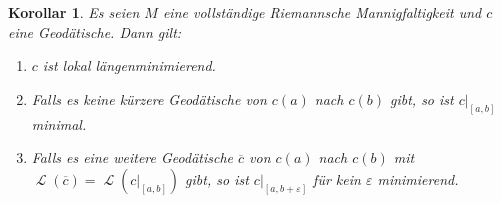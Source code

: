 \documentclass[paper=A4, twoside, chapterprefix=true, bibliography=totoc, headsepline]{scrbook}
\let\temp\phi{}
\let\phi\varphi{}
\let\varphi\temp{}
\let\temp\theta{}
\let\theta\vartheta{}
\let\vartheta\temp{}
\let\temp\epsilon{}
\let\epsilon\varepsilon{}
\let\varepsilon\temp{}
\let\temp\rho{}
\let\rho\varrho{}
\let\varrho\temp{}
\DeclareMathOperator{\calL}{\mathcal{L}}
\theoremstyle{plain}
\newtheorem{Kor}[Dfn]{Korollar}
\theoremstyle{nonumberplain}
\theoremstyle{empty}
\theoremstyle{break}
\begin{document}
\begin{Kor}\label{thm:kor-8-12}
  Es seien $M$ eine vollst\"andige Riemannsche Mannigfaltigkeit und $c$ eine Geod\"atische. Dann gilt:
  \begin{enumerate}[label=(\roman*),widest=iii,leftmargin=*]
  \item $c$ ist lokal l\"angenminimierend.
  \item Falls es keine k\"urzere Geod\"atische von $c(a)$ nach $c(b)$ gibt, so ist $c|_{[a,b]}$ minimal.
  \item Falls es eine weitere Geod\"atische $\overline{c}$ von $c(a)$ nach $c(b)$ mit $\calL(\overline c) = \calL(c|_{[a,b]})$ gibt, so ist $c|_{[a,b+\epsilon]}$ f\"ur kein $\epsilon$ minimierend.\label{thm:kor-8-12-iii} 
  \end{enumerate}
\end{Kor}
\end{document}
